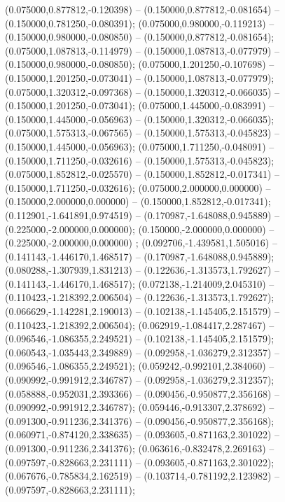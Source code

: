 (0.075000,0.877812,-0.120398) -- (0.150000,0.877812,-0.081654) -- (0.150000,0.781250,-0.080391);
 (0.075000,0.980000,-0.119213) -- (0.150000,0.980000,-0.080850) -- (0.150000,0.877812,-0.081654);
 (0.075000,1.087813,-0.114979) -- (0.150000,1.087813,-0.077979) -- (0.150000,0.980000,-0.080850);
 (0.075000,1.201250,-0.107698) -- (0.150000,1.201250,-0.073041) -- (0.150000,1.087813,-0.077979);
 (0.075000,1.320312,-0.097368) -- (0.150000,1.320312,-0.066035) -- (0.150000,1.201250,-0.073041);
 (0.075000,1.445000,-0.083991) -- (0.150000,1.445000,-0.056963) -- (0.150000,1.320312,-0.066035);
 (0.075000,1.575313,-0.067565) -- (0.150000,1.575313,-0.045823) -- (0.150000,1.445000,-0.056963);
 (0.075000,1.711250,-0.048091) -- (0.150000,1.711250,-0.032616) -- (0.150000,1.575313,-0.045823);
 (0.075000,1.852812,-0.025570) -- (0.150000,1.852812,-0.017341) -- (0.150000,1.711250,-0.032616);
 (0.075000,2.000000,0.000000) -- (0.150000,2.000000,0.000000) -- (0.150000,1.852812,-0.017341);
 (0.112901,-1.641891,0.974519) -- (0.170987,-1.648088,0.945889) -- (0.225000,-2.000000,0.000000);
 (0.150000,-2.000000,0.000000) -- (0.225000,-2.000000,0.000000) ;
 (0.092706,-1.439581,1.505016) -- (0.141143,-1.446170,1.468517) -- (0.170987,-1.648088,0.945889);
 (0.080288,-1.307939,1.831213) -- (0.122636,-1.313573,1.792627) -- (0.141143,-1.446170,1.468517);
 (0.072138,-1.214009,2.045310) -- (0.110423,-1.218392,2.006504) -- (0.122636,-1.313573,1.792627);
 (0.066629,-1.142281,2.190013) -- (0.102138,-1.145405,2.151579) -- (0.110423,-1.218392,2.006504);
 (0.062919,-1.084417,2.287467) -- (0.096546,-1.086355,2.249521) -- (0.102138,-1.145405,2.151579);
 (0.060543,-1.035443,2.349889) -- (0.092958,-1.036279,2.312357) -- (0.096546,-1.086355,2.249521);
 (0.059242,-0.992101,2.384060) -- (0.090992,-0.991912,2.346787) -- (0.092958,-1.036279,2.312357);
 (0.058888,-0.952031,2.393366) -- (0.090456,-0.950877,2.356168) -- (0.090992,-0.991912,2.346787);
 (0.059446,-0.913307,2.378692) -- (0.091300,-0.911236,2.341376) -- (0.090456,-0.950877,2.356168);
 (0.060971,-0.874120,2.338635) -- (0.093605,-0.871163,2.301022) -- (0.091300,-0.911236,2.341376);
 (0.063616,-0.832478,2.269163) -- (0.097597,-0.828663,2.231111) -- (0.093605,-0.871163,2.301022);
 (0.067676,-0.785834,2.162519) -- (0.103714,-0.781192,2.123982) -- (0.097597,-0.828663,2.231111);
